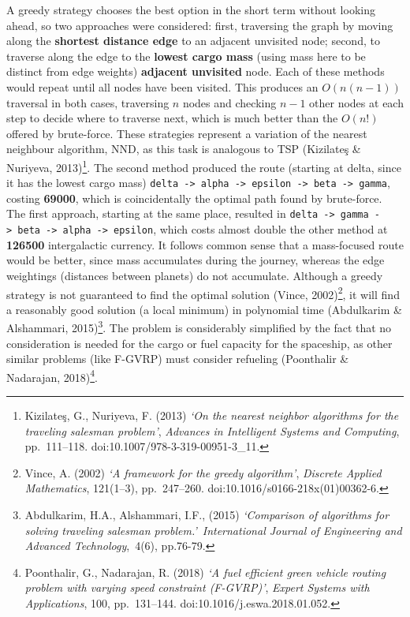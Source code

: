 \documentclass[
]{article}
\begin{document}
A greedy strategy chooses the best option in the short term without
looking ahead, so two approaches were considered: first, traversing the
graph by moving along the \textbf{shortest distance edge} to an adjacent
unvisited node; second, to traverse along the edge to the \textbf{lowest
cargo mass} (using mass here to be distinct from edge weights)
\textbf{adjacent unvisited} node. Each of these methods would repeat
until all nodes have been visited. This produces an \(O(n(n-1))\)
traversal in both cases, traversing \(n\) nodes and checking \(n-1\)
other nodes at each step to decide where to traverse next, which is much
better than the \(O(n!)\) offered by brute-force. These strategies
represent a variation of the nearest neighbour algorithm, NND, as this
task is analogous to TSP (Kizilateş \& Nuriyeva, 2013)\footnote{Kizilateş,
  G., Nuriyeva, F. (2013) \emph{`On the nearest neighbor algorithms for
  the traveling salesman problem'}, \emph{Advances in Intelligent
  Systems and Computing}, pp.~111--118.
  doi:10.1007/978-3-319-00951-3\_11.}. The second method produced the
route (starting at delta, since it has the lowest cargo mass)
\texttt{delta\ -\textgreater{}\ alpha\ -\textgreater{}\ epsilon\ -\textgreater{}\ beta\ -\textgreater{}\ gamma},
costing \textbf{69000}, which is coincidentally the optimal path found
by brute-force. The first approach, starting at the same place, resulted
in
\texttt{delta\ -\textgreater{}\ gamma\ -\textgreater{}\ beta\ -\textgreater{}\ alpha\ -\textgreater{}\ epsilon},
which costs almost double the other method at \textbf{126500}
intergalactic currency. It follows common sense that a mass-focused
route would be better, since mass accumulates during the journey,
whereas the edge weightings (distances between planets) do not
accumulate. Although a greedy strategy is not guaranteed to find the
optimal solution (Vince, 2002)\footnote{Vince, A. (2002) \emph{`A
  framework for the greedy algorithm'}, \emph{Discrete Applied
  Mathematics}, 121(1--3), pp.~247--260.
  doi:10.1016/s0166-218x(01)00362-6.}, it will find a reasonably good
solution (a local minimum) in polynomial time (Abdulkarim \& Alshammari,
2015)\footnote{Abdulkarim, H.A., Alshammari, I.F., (2015)
  \emph{`Comparison of algorithms for solving traveling salesman
  problem.'}~\emph{International Journal of Engineering and Advanced
  Technology},~4(6), pp.76-79.}. The problem is considerably simplified
by the fact that no consideration is needed for the cargo or fuel
capacity for the spaceship, as other similar problems (like F-GVRP) must
consider refueling (Poonthalir \& Nadarajan, 2018)\footnote{Poonthalir,
  G., Nadarajan, R. (2018) \emph{`A fuel efficient green vehicle routing
  problem with varying speed constraint (F-GVRP)'}, \emph{Expert Systems
  with Applications}, 100, pp.~131--144. doi:10.1016/j.eswa.2018.01.052.}.
\end{document}
